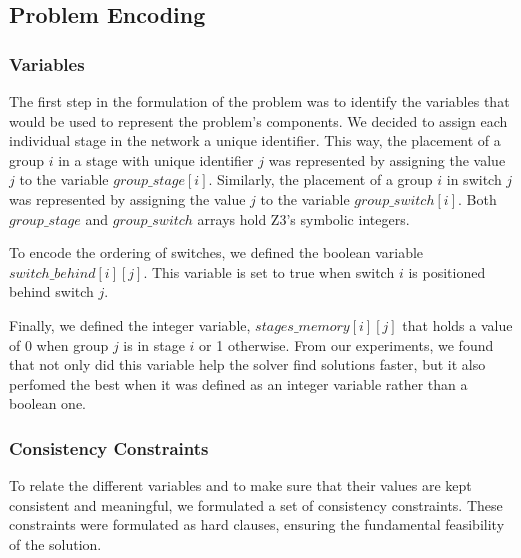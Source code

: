 \subsection{Problem Encoding}

\subsubsection{Variables}

The first step in the formulation of the problem was to identify the variables that would be used to represent the problem's components. We decided to assign each individual stage in the network a unique identifier. This way, the placement of a group \(i\) in a stage with unique identifier \(j\) was represented by assigning the value $j$ to the variable \(group\_stage[i]\). Similarly, the placement of a group \(i\) in switch \(j\) was represented by assigning the value $j$ to the variable \(group\_switch[i]\). Both \(group\_stage\) and \(group\_switch\) arrays hold Z3's symbolic integers.

To encode the ordering of switches, we defined the boolean variable $switch\_behind[i][j]$. This variable is set to true when switch \(i\) is positioned behind switch \(j\).

Finally, we defined the integer variable, $stages\_memory[i][j]$ that holds a value of 0 when group \(j\) is in stage \(i\) or 1 otherwise. From our experiments, we found that not only did this variable help the solver find solutions faster, but it also perfomed the best when it was defined as an integer variable rather than a boolean one.

\subsubsection{Consistency Constraints}

To relate the different variables and to make sure that their values are kept consistent and meaningful, we formulated a set of consistency constraints. These constraints were formulated as hard clauses, ensuring the fundamental feasibility of the solution.

